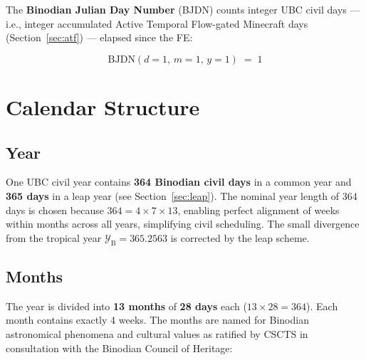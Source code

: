 \documentclass[journal,twoside]{IEEEtran}
\begin{document}
The \textbf{Binodian Julian Day Number} (BJDN) counts integer UBC civil days --- i.e.,
integer accumulated Active Temporal Flow-gated Minecraft days (Section~\ref{sec:atf}) ---
elapsed since the FE:

\begin{equation}
\mathrm{BJDN}(d=1,\,m=1,\,y=1) \;=\; 1
\label{eq:bjdn_epoch}
\end{equation}

\section{Calendar Structure}

\subsection{Year}

One UBC civil year contains \textbf{364 Binodian civil days} in a common year and
\textbf{365 days} in a leap year (see Section~\ref{sec:leap}).  The nominal year length
of 364 days is chosen because $364 = 4 \times 7 \times 13$, enabling perfect alignment
of weeks within months across all years, simplifying civil scheduling.  The small
divergence from the tropical year $\mathcal{Y}_{\mathrm{B}} = 365.2563$ is corrected by
the leap scheme.

\subsection{Months}

The year is divided into \textbf{13 months} of \textbf{28 days} each ($13 \times 28 = 364$).
Each month contains exactly 4 weeks.  The months are named for Binodian astronomical
phenomena and cultural values as ratified by CSCTS in consultation with the Binodian
Council of Heritage:
\end{document}
